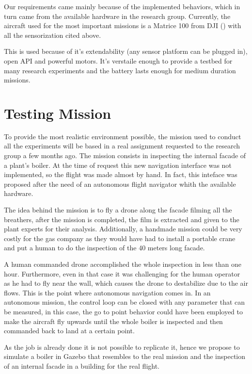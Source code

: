   Our requirements came mainly because of the implemented behaviors, which in turn came from the available hardware in the research group. Currently, the aircraft used for the most important missions is a Matrice 100 from DJI (\cite{dji_matrice_web}) with all the sensorization cited above.

  This is used because of it's extendability (any sensor platform can be plugged in), open API and powerful motors. It's verstaile enough to provide a testbed for many research experiments and the battery lasts enough for medium duration missions.

\section{Testing Mission} \label{ch_5:sect:testing_mission}

  To provide the most realistic environment possible, the mission used to conduct all the experiments will be based in a real assignment requested to the research group a few months ago. The mission consists in inspecting the internal facade of a plant's boiler. At the time of request this new navigation interface was not implemented, so the flight was made almost by hand. In fact, this inteface was proposed after the need of an autonomous flight navigator whith the available hardware.

  The idea behind the mission is to fly a drone along the facade filming all the breathers, after the mission is completed, the film is extracted and given to the plant experts for their analysis. Additionally, a handmade mission could be very costly for the gas company as they would have had to install a portable crane and put a human to do the inspection of the 40 meters long facade.

  A human commanded drone accomplished the whole inspection in less than one hour. Furthermore, even in that case it was challenging for the human operator as he had to fly near the wall, which causes the drone to destabilize due to the air flows. This is the point where autonomous navigation comes in. In an autonomous mission, the control loop can be closed with any parameter that can be measured, in this case, the go to point behavior could have been employed to make the aircraft fly upwards until the whole boiler is inspected and then commanded back to land at a certain point.

  As the job is already done it is not possible to replicate it, hence we propose to simulate a boiler in Gazebo that resembles to the real mission and the inspection of an internal facade in a building for the real flight.

